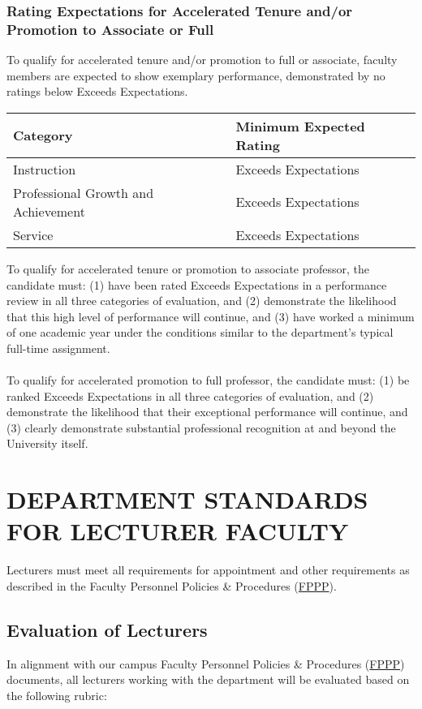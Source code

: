 \documentclass{scrartcl}
\begin{document}
\subsubsection{Rating Expectations for Accelerated Tenure and/or Promotion to Associate or Full}
To qualify for accelerated tenure and/or promotion to full or associate, faculty members are expected to show exemplary performance, demonstrated by no ratings below Exceeds Expectations.

\begin{longtable}{p{7cm}p{7cm}}

\hline
\textbf{Category} & \textbf{Minimum Expected Rating} \\
\hline
\endhead %
Instruction 	& Exceeds Expectations \\ \hline
Professional Growth and Achievement 	& Exceeds Expectations \\ \hline
Service 	& Exceeds Expectations \\ \hline
\end{longtable}

To qualify for accelerated tenure or promotion to associate professor, the candidate must: (1) have been rated Exceeds Expectations in a performance review in all three categories of evaluation, and (2) demonstrate the likelihood that this high level of performance will continue, and (3) have worked a minimum of one academic year under the conditions similar to the department’s typical full-time assignment.
\\\\
To qualify for accelerated promotion to full professor, the candidate must: (1) be ranked Exceeds Expectations in all three categories of evaluation, and (2) demonstrate the likelihood that their exceptional performance will continue, and (3) clearly demonstrate substantial professional recognition at and beyond the University itself.


\section{DEPARTMENT STANDARDS FOR LECTURER FACULTY}
Lecturers must meet all requirements for appointment and other requirements as described in the Faculty Personnel Policies \& Procedures (\href{https://www.csuchico.edu/oapl/fppp.shtml}{FPPP}).
\subsection{Evaluation of Lecturers}
In alignment with our campus Faculty Personnel Policies \& Procedures (\href{https://www.csuchico.edu/oapl/fppp.shtml}{FPPP}) documents, all lecturers working with the department will be evaluated based on the following rubric:
\end{document}
